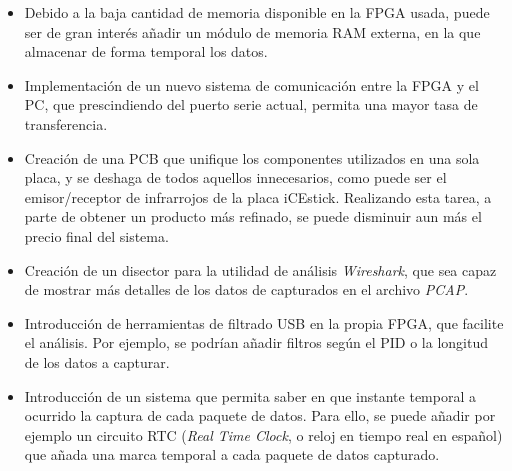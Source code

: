 \begin{itemize}
    \item Debido a la baja cantidad de memoria disponible en la FPGA usada, puede ser de gran interés añadir un módulo de memoria RAM externa, en la que almacenar de forma temporal los datos.
    
    \item Implementación de un nuevo sistema de comunicación entre la FPGA y el PC, que prescindiendo del puerto serie actual, permita una mayor tasa de transferencia.
    
    \item Creación de una PCB que unifique los componentes utilizados en una sola placa, y se deshaga de todos aquellos innecesarios, como puede ser el emisor/receptor de infrarrojos de la placa iCEstick. Realizando esta tarea, a parte de obtener un producto más refinado, se puede disminuir aun más el precio final del sistema.
    
    \item Creación de un disector para la utilidad de análisis \emph{Wireshark}, que sea capaz de mostrar más detalles de los datos de capturados en el archivo \emph{PCAP}.
    
    \item Introducción de herramientas de filtrado USB en la propia FPGA, que facilite el análisis. Por ejemplo, se podrían añadir filtros según el PID o la longitud de los datos a capturar.

    \item Introducción de un sistema que permita saber en que instante temporal a ocurrido la captura de cada paquete de datos. Para ello, se puede añadir por ejemplo un circuito RTC (\emph{Real Time Clock}, o reloj en tiempo real en español) que añada una marca temporal a cada paquete de datos capturado.
\end{itemize}





